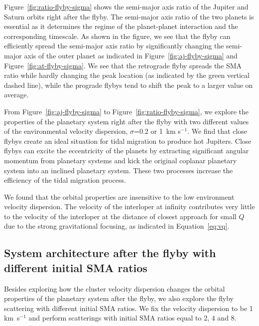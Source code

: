 \documentclass[twocolumn]{aastex63}
\newcommand*\fgr[1]{Figure~\ref{#1}}
\newcommand*\eqn[1]{Equation~\ref{#1}}
\begin{document}
\fgr{fig:ratio-flyby-sigma} shows the semi-major axis ratio of the Jupiter and Saturn orbits right after the flyby. The semi-major axis ratio of the two planets is essential as it determines the regime of the planet-planet interaction and the corresponding timescale. As shown in the figure, we see that the flyby can efficiently spread the semi-major axis ratio by significantly changing the semi-major axis of the outer planet as indicated in \fgr{fig:aj-flyby-sigma} and \fgr{fig:at-flyby-sigma}. We see that the retrograde flyby spreads the SMA ratio while hardly changing the peak location (as indicated by the green vertical dashed line), while the prograde flybys tend to shift the peak to a larger value on average. 

From \fgr{fig:aj-flyby-sigma} to \fgr{fig:ratio-flyby-sigma}, we explore the properties of the planetary system right after the flyby with two different values of the environmental velocity dispersion, $\sigma$=0.2 or 1~km s$^{-1}$. We find that close flybys create an ideal situation for tidal migration to produce hot Jupiters. Close flybys can excite the eccentricity of the planets by extracting significant angular momentum from planetary systems and kick the original coplanar planetary system into an inclined planetary system. These two processes increase the efficiency of the tidal migration process.

We found that the orbital properties are insensitive to the low environment velocity dispersion. The velocity of the interloper at infinity contributes very little to the velocity of the interloper at the distance of closest approach for small $Q$ due to the strong gravitational focusing, as indicated in \eqn{eq:vq}.

\subsection{System architecture after the flyby with different initial SMA ratios}\label{sec:sma-ratio}
Besides exploring how the cluster velocity dispersion changes the orbital properties of the planetary system after the flyby, we also explore the flyby scattering with different initial SMA ratios. We fix the velocity dispersion to be 1 km~s$^{-1}$ and perform scatterings with initial SMA ratios equal to 2, 4 and 8.
\end{document}

